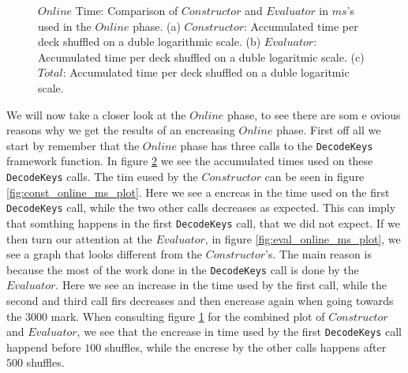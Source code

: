 \documentclass[twoside,11pt,openright]{report}
\begin{document}
\begin{figure}
    \begin{subfigure}{\textwidth}
        \centering
        \caption{}
        \label{fig:total_online_ms_plot}
    \end{subfigure}

    \caption{$Online$ Time: Comparison of $Constructor$ and $Evaluator$ in $ms$'s used in the $Online$ phase. (a) $Constructor$: Accumulated time per deck shuffled on a duble logarithmic scale. (b) $Evaluator$: Accumulated time per deck shuffled on a duble logaritmic scale. (c) $Total$: Accumulated time per deck shuffled on a duble logaritmic scale.}
    \label{fig:mesurement_online_ms}
\end{figure}

We will now take a closer look at the $Online$ phase, to see there are som e ovious reasons why we get the results of an encreasing $Online$ phase. First off all we start by remember that the $Online$ phase has three calls to the \verb|DecodeKeys| framework function. In figure \ref{fig:mesurement_online_ms} we see the accumulated times used on these \verb|DecodeKeys| calls. The tim eused by the $Constructor$ can be seen in figure \ref{fig:const_online_ms_plot}. Here we see a encreas in the time used on the first \verb|DecodeKeys| call, while the two other calls decreases as expected. This can imply that somthing happens in the first \verb|DecodeKeys| call, that we did not expect. If we then turn our attention at the $Evaluator$, in figure \ref{fig:eval_online_ms_plot}, we see a graph that looks different from the $Constructor$'s. The main reason is because the most of the work done in the \verb|DecodeKeys| call is done by the $Evaluator$. Here we see an increase in the time used by the first call, while the second and third call firs decreases and then encrease again when going towards the $3000$ mark. When consulting figure \ref{fig:total_online_ms_plot} for the combined plot of $Constructor$ and $Evaluator$, we see that the encrease in time used by the first \verb|DecodeKeys| call happend before $100$ shuffles, while the encrese by the other calls happens after $500$ shuffles. 
\end{document}

